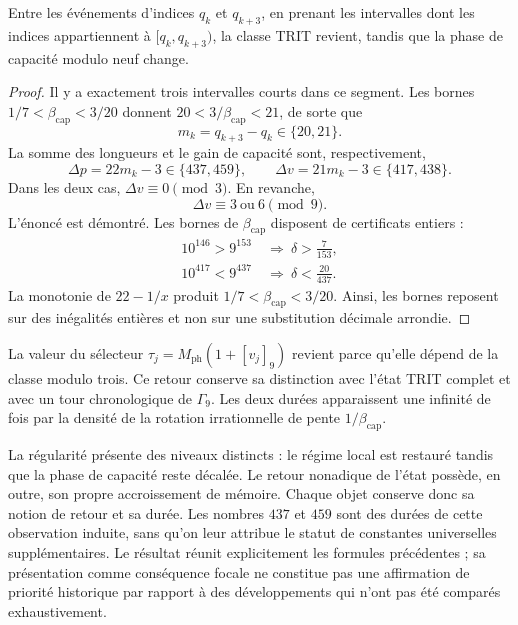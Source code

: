 \begin{proposition}
\label{md:restop:proposicion-regimen}
Entre les événements d’indices $q_k$ et $q_{k+3}$, en prenant les intervalles dont
les indices appartiennent à $[q_k,q_{k+3})$, la classe TRIT revient, tandis que la phase
de capacité modulo neuf change.
\end{proposition}
\begin{proof}
Il y a exactement trois intervalles courts dans ce segment.
Les bornes $1/7<\beta_{\mathrm{cap}}<3/20$ donnent
$20<3/\beta_{\mathrm{cap}}<21$, de sorte que
\begin{equation}
 m_k=q_{k+3}-q_k\in\{20,21\}.
 \label{md:restop:duracion-tritica}
\end{equation}
La somme des longueurs et le gain de capacité sont, respectivement,
\begin{equation}
 \Delta p=22m_k-3\in\{437,459\},\qquad
 \Delta v=21m_k-3\in\{417,438\}.
 \label{md:restop:ganancias}
\end{equation}
Dans les deux cas, $\Delta v\equiv0\pmod3$. En revanche,
\begin{equation}
 \boxed{\Delta v\equiv3\ \text{ou}\ 6\pmod9.}
 \label{md:restop:desplazamiento-nonadico}
\end{equation}
L’énoncé est démontré.
Les bornes de $\beta_{\mathrm{cap}}$ disposent de certificats entiers :
\begin{equation}
 \begin{aligned}
 10^{146}>9^{153}&\ \Longrightarrow\
 \delta>\frac7{153},\\
 10^{417}<9^{437}&\ \Longrightarrow\
 \delta<\frac{20}{437}.
 \end{aligned}
 \label{md:restop:certificados-cotas}
\end{equation}
La monotonie de $22-1/x$ produit
$1/7<\beta_{\mathrm{cap}}<3/20$. Ainsi, les bornes reposent sur des
inégalités entières et non sur une substitution décimale arrondie.
\end{proof}

La valeur du sélecteur
$\tau_j=M_{\mathrm{ph}}(1+[v_j]_9)$ revient parce qu’elle dépend de la classe
modulo trois. Ce retour conserve sa distinction avec l’état TRIT
complet et avec un tour chronologique de $\Gamma_9$.
Les deux durées apparaissent une infinité de fois par la densité de la rotation
irrationnelle de pente $1/\beta_{\mathrm{cap}}$.

La régularité présente des niveaux distincts : le régime local est restauré
tandis que la phase de capacité reste décalée. Le retour nonadique de
l’état possède, en outre, son propre accroissement de mémoire. Chaque objet
conserve donc sa notion de retour et sa durée.
Les nombres $437$ et $459$ sont des durées de cette observation induite,
sans qu’on leur attribue le statut de constantes universelles supplémentaires.
Le résultat réunit explicitement les formules précédentes ; sa présentation
comme conséquence focale ne constitue pas une affirmation de priorité
historique par rapport à des développements qui n’ont pas été comparés exhaustivement.


